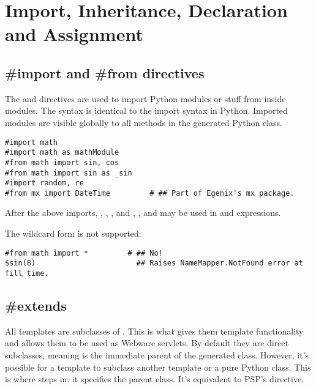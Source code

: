 \section{Import, Inheritance, Declaration and Assignment}
\label{inheritanceEtc}


\subsection{\#import and \#from directives}
\label{inheritanceEtc.import}

The  and  directives are used to import Python
modules or stuff from inside modules.  The syntax is identical to the import
syntax in Python.  Imported modules are visible globally to all methods in the
generated Python class.

\begin{verbatim}
#import math
#import math as mathModule
#from math import sin, cos
#from math import sin as _sin
#import random, re
#from mx import DateTime         # ## Part of Egenix's mx package.
\end{verbatim}

After the above imports, , , 
,  and , ,  
and  may be used in  and expressions.

The wildcard form  is not supported:
\begin{verbatim}
#from math import *         # ## No!  
$sin(8)                       ## Raises NameMapper.NotFound error at fill time.
\end{verbatim}

\subsection{\#extends}
\label{inheritanceEtc.extends}

All templates are subclasses of .  This is what
gives them template functionality and allows them to be used as Webware
servlets.  By default they are direct subclasses, meaning  is
the immediate parent of the generated class.  However, it's possible for a
template to subclass another template or a pure Python class.  This is where
 steps in: it specifies the parent class.  It's equivalent to
PSP's  directive. 

